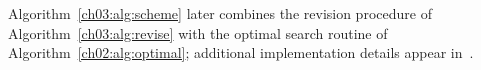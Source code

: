 Algorithm~\ref{ch03:alg:scheme} later combines the revision procedure of
Algorithm~\ref{ch03:alg:revise} with the optimal search routine of
Algorithm~\ref{ch02:alg:optimal}; additional implementation details appear
in~\citep{guo2014cooperative}. 

\endgroup
